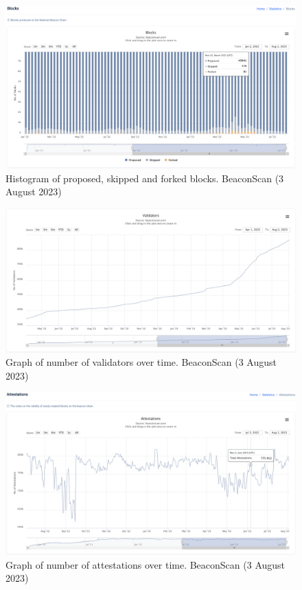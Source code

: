 \documentclass[UTF8]{article}
\begin{document}
{\begin{figure}[htbp]
\begin{center}
\includegraphics[width=\linewidth]{images/beaconscan8}
\caption{Histogram of proposed, skipped and forked blocks. BeaconScan (3 August 2023)}
\label{fig:beaconscan8}
\end{center}
\end{figure}

\begin{figure}[htbp]
\begin{center}
\includegraphics[width=\linewidth]{images/beaconscan9}
\caption{Graph of number of validators over time. BeaconScan (3 August 2023)}
\label{fig:beaconscan9}
\end{center}
\end{figure}

\begin{figure}[htbp]
\begin{center}
\includegraphics[width=\linewidth]{images/beaconscan10}
\caption{Graph of number of attestations over time. BeaconScan (3 August 2023)}
\label{fig:beaconscan10}
\end{center}
\end{figure}

}
\end{document}

